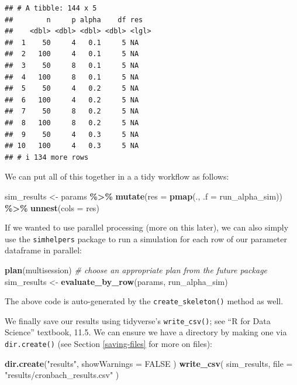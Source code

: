\documentclass[
]{book}
\newenvironment{Shaded}{\begin{snugshade}}{\end{snugshade}}
\newcommand{\AttributeTok}[1]{\textcolor[rgb]{0.13,0.29,0.53}{#1}}
\newcommand{\CommentTok}[1]{\textcolor[rgb]{0.56,0.35,0.01}{\textit{#1}}}
\newcommand{\ConstantTok}[1]{\textcolor[rgb]{0.56,0.35,0.01}{#1}}
\newcommand{\FunctionTok}[1]{\textcolor[rgb]{0.13,0.29,0.53}{\textbf{#1}}}
\newcommand{\NormalTok}[1]{#1}
\newcommand{\OtherTok}[1]{\textcolor[rgb]{0.56,0.35,0.01}{#1}}
\newcommand{\SpecialCharTok}[1]{\textcolor[rgb]{0.81,0.36,0.00}{\textbf{#1}}}
\newcommand{\StringTok}[1]{\textcolor[rgb]{0.31,0.60,0.02}{#1}}
\begin{document}
\begin{verbatim}
## # A tibble: 144 x 5
##        n     p alpha    df res  
##    <dbl> <dbl> <dbl> <dbl> <lgl>
##  1    50     4   0.1     5 NA   
##  2   100     4   0.1     5 NA   
##  3    50     8   0.1     5 NA   
##  4   100     8   0.1     5 NA   
##  5    50     4   0.2     5 NA   
##  6   100     4   0.2     5 NA   
##  7    50     8   0.2     5 NA   
##  8   100     8   0.2     5 NA   
##  9    50     4   0.3     5 NA   
## 10   100     4   0.3     5 NA   
## # i 134 more rows
\end{verbatim}

We can put all of this together in a a tidy workflow as follows:

\begin{Shaded}
\begin{Highlighting}[]
\NormalTok{sim\_results }\OtherTok{\textless{}{-}} 
\NormalTok{  params }\SpecialCharTok{\%\textgreater{}\%}
  \FunctionTok{mutate}\NormalTok{(}\AttributeTok{res =} \FunctionTok{pmap}\NormalTok{(., }\AttributeTok{.f =}\NormalTok{ run\_alpha\_sim)) }\SpecialCharTok{\%\textgreater{}\%}
  \FunctionTok{unnest}\NormalTok{(}\AttributeTok{cols =}\NormalTok{ res)}
\end{Highlighting}
\end{Shaded}

If we wanted to use parallel processing (more on this later), we can also simply use the \texttt{simhelpers} package to run a simulation for each row of our parameter dataframe in parallel:

\begin{Shaded}
\begin{Highlighting}[]
\FunctionTok{plan}\NormalTok{(multisession) }\CommentTok{\# choose an appropriate plan from the future package}
\NormalTok{sim\_results }\OtherTok{\textless{}{-}} \FunctionTok{evaluate\_by\_row}\NormalTok{(params, run\_alpha\_sim)}
\end{Highlighting}
\end{Shaded}

The above code is auto-generated by the \texttt{create\_skeleton()} method as well.

We finally save our results using tidyverse's \texttt{write\_csv()}; see ``R for Data Science'' textbook, 11.5.
We can ensure we have a directory by making one via \texttt{dir.create()} (see Section \ref{saving-files} for more on files):

\begin{Shaded}
\begin{Highlighting}[]
\FunctionTok{dir.create}\NormalTok{(}\StringTok{"results"}\NormalTok{, }\AttributeTok{showWarnings =} \ConstantTok{FALSE}\NormalTok{ )}
\FunctionTok{write\_csv}\NormalTok{( sim\_results, }\AttributeTok{file =} \StringTok{"results/cronbach\_results.csv"}\NormalTok{ )}
\end{Highlighting}
\end{Shaded}
\end{document}
